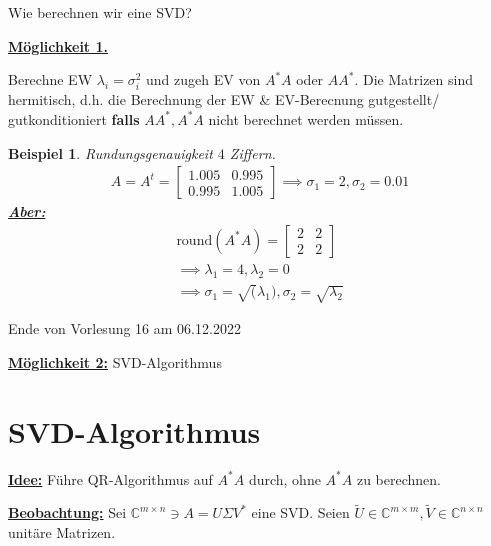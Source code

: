 \documentclass{book}
\newtheorem{example}[algorithm]{Beispiel}
\def\C{\mathbb{C}}
\begin{document}
            Wie berechnen wir eine SVD?

            \underline{\textbf{Möglichkeit 1.}}

            Berechne EW $\lambda_i=\sigma_i^2$ und zugeh EV von $A^*A$ oder $AA^*$. Die Matrizen sind hermitisch, d.h.
            die Berechnung der EW \& EV-Berecnung gutgestellt/ gutkonditioniert \textbf{falls} $AA^*, A^*A$ nicht 
            berechnet werden müssen.

            \begin{example}\label{b4.27}
                Rundungsgenauigkeit $4$ Ziffern.
                \begin{align*}
                    A=A^t = \begin{bmatrix}
                        1.005 & 0.995 \\
                        0.995 & 1.005
                    \end{bmatrix} \implies \sigma_1=2,\sigma_2=0.01
                \end{align*}
                \underline{\textbf{Aber:}} 
                \begin{align*}
                    \text{round}(A^* A)=\begin{bmatrix}
                        2&2\\
                        2&2
                    \end{bmatrix}\\
                    \implies \lambda_1=4,\lambda_2=0\\
                     \implies \sigma_1 =\sqrt(\lambda_1),\sigma_2=\sqrt{\lambda_2}
                \end{align*}
            \end{example}

            \noindent
            \xrfill[0.7ex]{1pt}Ende von Vorlesung 16 am 06.12.2022\xrfill[0.7ex]{1pt}
            
            \underline{\textbf{Möglichkeit 2:}} SVD-Algorithmus

        \section{SVD-Algorithmus}

            \underline{\textbf{Idee:}} Führe QR-Algorithmus auf $A^*A$ durch, ohne $A^*A$ zu berechnen.

            \underline{\textbf{Beobachtung:}} Sei $\C^{m\times n} \ni A=U\Sigma V^*$ eine SVD. Seien $\tilde{U}\in\C^{m\times m},\tilde{V}\in\C^{n\times n}$ unitäre Matrizen.
\end{document}

